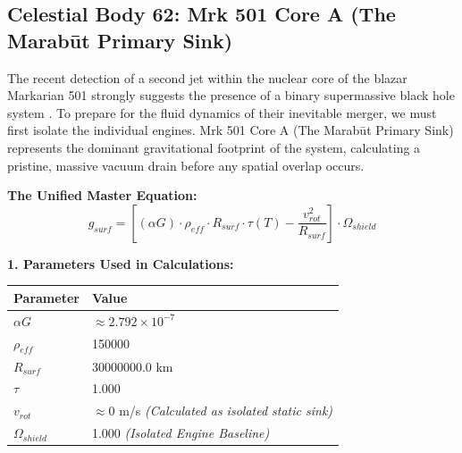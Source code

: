 \documentclass[11pt, a4paper]{article}
\begin{document}
\clearpage
\subsection{Celestial Body 62: Mrk 501 Core A (The Marab\={u}t Primary Sink)}
  The recent detection of a second jet within the nuclear core of the blazar Markarian 501 strongly suggests the presence of a binary supermassive black hole system \cite{mrk501_2026}. To prepare for the fluid dynamics of their inevitable merger, we must first isolate the individual engines. Mrk 501 Core A (The Marab\={u}t Primary Sink) represents the dominant gravitational footprint of the system, calculating a pristine, massive vacuum drain before any spatial overlap occurs.

  \vspace{0.5em}
  \noindent \textbf{The Unified Master Equation:}
  $$ g_{surf} = \left[ (\alpha G) \cdot \rho_{eff} \cdot R_{surf} \cdot \tau(T) - \frac{v_{rot}^2}{R_{surf}} \right] \cdot \Omega_{shield} $$

  \vspace{0.5em}
  \noindent \textbf{1. Parameters Used in Calculations:} \\[0.5em]
  \begingroup
  \renewcommand{\arraystretch}{1.3}
  \hspace*{2em}
  \begin{tabular}{|l|l|}
    \hline
    \textbf{Parameter} & \textbf{Value} \\ \hline
    $\alpha G$ & $\approx 2.792 \times 10^{-7}$ \\ \hline
    $\rho_{eff}$ & 150000 \\ \hline
    $R_{surf}$ & 30000000.0 km \\ \hline
    $\tau$ & 1.000 \\ \hline
    $v_{rot}$ & $\approx 0$ m/s \textit{(Calculated as isolated static sink)} \\ \hline
    $\Omega_{shield}$ & 1.000 \textit{(Isolated Engine Baseline)} \\ \hline
  \end{tabular}
  \endgroup
\end{document}
